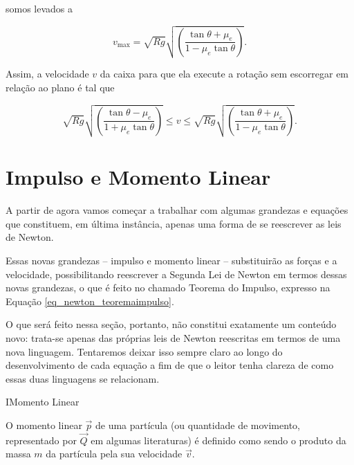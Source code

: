 \begin{exemplo}
\noindent somos levados a

$$ \boxed{ v_{\text{max}} = \sqrt{Rg} \sqrt{ \left( \dfrac{\tan \theta + \mu_e}{1 - \mu_e \tan \theta}\right)}.} $$

Assim, a velocidade $v$ da caixa para que ela execute a rotação sem escorregar em relação ao plano é tal que

$$ \sqrt{Rg} \sqrt{ \left( \dfrac{\tan \theta - \mu_e}{1 + \mu_e \tan \theta}\right)} \leq v \leq \sqrt{Rg} \sqrt{ \left( \dfrac{\tan \theta + \mu_e}{1 - \mu_e \tan \theta}\right)}. $$


\end{exemplo}





\newpage

\section{Impulso e Momento Linear}


\lettrine{A}{} partir de agora vamos começar a trabalhar com algumas grandezas e equações que constituem, em última instância, apenas uma forma de se reescrever as leis de Newton. 

Essas novas grandezas -- impulso e momento linear -- substituirão as forças e a velocidade, possibilitando reescrever a Segunda Lei de Newton em termos dessas novas grandezas, o que é feito no chamado Teorema do Impulso, expresso na Equação \eqref{eq_newton_teoremaimpulso}.

O que será feito nessa seção, portanto, não constitui exatamente um conteúdo novo: trata-se apenas das próprias leis de Newton reescritas em termos de uma nova linguagem. Tentaremos deixar isso sempre claro ao longo do desenvolvimento de cada equação a fim de que o leitor tenha clareza de como essas duas linguagens se relacionam. 







\begin{secnivel}{I}{Momento Linear}
  

\end{secnivel}







O momento linear $\vec p$ de uma partícula (ou quantidade de movimento, representado por $\vec Q$ em algumas literaturas) é definido como sendo o produto da massa $m$ da partícula pela sua velocidade $\vec v.$

